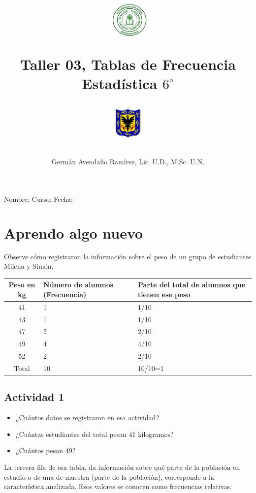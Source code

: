 \documentclass[10pt,twoside]{article}
\author{Germ\'an Avenda\~no Ram\'irez, Lic. U.D., M.Sc. U.N.}
\title{\begin{minipage}{.2\textwidth}
\includegraphics[height=1.75cm]{Images/logo-colegio.png}\end{minipage}
\begin{minipage}{.55\textwidth}
\begin{center}
Taller 03, Tablas de Frecuencia  \\
Estadística $6^{\circ}$
\end{center}
\end{minipage}\hfill
\begin{minipage}{.2\textwidth}
\includegraphics[height=1.75cm]{Images/logo-sed.png} 
\end{minipage}}
\date{}
\begin{document}
\maketitle
Nombre: \hrulefill Curso: \underline{\hspace*{44pt}} Fecha: \underline{\hspace*{2.5cm}}
\section*{Aprendo algo nuevo}
Observe cómo registraron la información sobre el peso de un grupo de estudiantes Milena y Simón.
\begin{center}
\begin{tabular}{|c|p{3.5cm}|p{6cm}|}
\hline 
Peso en kg & Número de alumnos (Frecuencia) & Parte del total de alumnos que tienen ese peso \\ 
\hline 
41 & 1 & 1/10 \\ 
\hline 
43 & 1 & 1/10 \\ 
\hline 
47 & 2 & 2/10 \\ 
\hline 
49 & 4 & 4/10 \\ 
\hline 
52 & 2 & 2/10 \\ 
\hline \hline
Total & 10 & 10/10=1 \\ \hline
\end{tabular} 
\end{center}
\subsection*{Actividad 1}
\begin{itemize}
\item ¿Cuántos datos se registraron en esa actividad?
\item ¿Cuántas estudiantes del total pesan 41 kilogramos?
\item ¿Cuántos pesan 49?
\end{itemize}
La tercera fila de esa tabla, da información sobre qué parte de la población en estudio o de una de muestra (parte de la población), corresponde a la característica analizada. Esos valores se conocen como frecuencias relativas.
\end{document}
